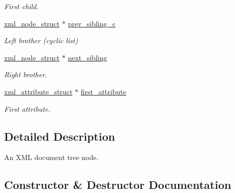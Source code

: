 \begin{DoxyCompactItemize}
\begin{DoxyCompactList}\small\item\em First child. \end{DoxyCompactList}\item 
\hypertarget{structpugi_1_1xml__node__struct_a74e62128c88c422c0ed969633bbb2d4e}{}\hyperlink{structpugi_1_1xml__node__struct}{xml\+\_\+node\+\_\+struct} $\ast$ \hyperlink{structpugi_1_1xml__node__struct_a74e62128c88c422c0ed969633bbb2d4e}{prev\+\_\+sibling\+\_\+c}\label{structpugi_1_1xml__node__struct_a74e62128c88c422c0ed969633bbb2d4e}

\begin{DoxyCompactList}\small\item\em Left brother (cyclic list) \end{DoxyCompactList}\item 
\hypertarget{structpugi_1_1xml__node__struct_acf0867e3a77871e37132046d97398a6d}{}\hyperlink{structpugi_1_1xml__node__struct}{xml\+\_\+node\+\_\+struct} $\ast$ \hyperlink{structpugi_1_1xml__node__struct_acf0867e3a77871e37132046d97398a6d}{next\+\_\+sibling}\label{structpugi_1_1xml__node__struct_acf0867e3a77871e37132046d97398a6d}

\begin{DoxyCompactList}\small\item\em Right brother. \end{DoxyCompactList}\item 
\hypertarget{structpugi_1_1xml__node__struct_a482d2daf97ce0745661cb2c57d8f6fb3}{}\hyperlink{structpugi_1_1xml__attribute__struct}{xml\+\_\+attribute\+\_\+struct} $\ast$ \hyperlink{structpugi_1_1xml__node__struct_a482d2daf97ce0745661cb2c57d8f6fb3}{first\+\_\+attribute}\label{structpugi_1_1xml__node__struct_a482d2daf97ce0745661cb2c57d8f6fb3}

\begin{DoxyCompactList}\small\item\em First attribute. \end{DoxyCompactList}\end{DoxyCompactItemize}


\subsection{Detailed Description}
An X\+M\+L document tree node. 

\subsection{Constructor \& Destructor Documentation}
\hypertarget{structpugi_1_1xml__node__struct_af9af20f835af8b6b99f9a39c93920ea6}{}
